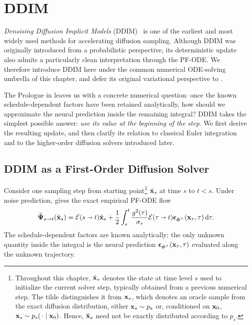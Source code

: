 \clearpage
\newpage

\section{\texorpdfstring{DDIM}{DDIM}}\label{sec:revisit-ddim}

\emph{Denoising Diffusion Implicit Models} (DDIM)~\citep{song2020denoising}
is one of the earliest and most widely used methods for accelerating diffusion
sampling. Although DDIM was originally introduced from a probabilistic
perspective, its deterministic update also admits a particularly clean
interpretation through the PF-ODE. We therefore introduce DDIM here under the
common numerical ODE-solving umbrella of this chapter, and defer its original
variational perspective to .

The Prologue in  leaves us with a concrete numerical question: once the known
schedule-dependent factors have been retained analytically, how should we
approximate the neural prediction inside the remaining integral? DDIM takes
the simplest possible answer: \emph{use its value at the beginning of the step}.
We first derive the resulting update, and then clarify its relation to
classical Euler integration and to the higher-order diffusion solvers
introduced later.


\subsection{DDIM as a First-Order Diffusion Solver}\label{subsec:ddim-different-para}

Consider one sampling step from starting point\footnote{Throughout this chapter, $\tilde{{\mathbf{x}}}_s$ denotes the state at time level $s$ used to initialize the current solver step, typically obtained from a previous numerical step. The tilde distinguishes it from ${\mathbf{x}}_s$, which denotes an oracle sample from the exact diffusion distribution, either ${\mathbf{x}}_s \sim p_s$ or, conditioned on ${\mathbf{x}}_0$, ${\mathbf{x}}_s \sim p_s(\,\cdot \mid {\mathbf{x}}_0)$. Hence, $\tilde{{\mathbf{x}}}_s$ need not be exactly distributed according to $p_s$.} $\tilde{{\mathbf{x}}}_s$ at time $s$ to $t<s$. Under noise prediction,
 gives the exact empirical PF-ODE flow
\begin{align*}
\widetilde{{\bm{\Psi}}}_{s\to t}(\tilde{{\mathbf{x}}}_s)
=
\mathcal E(s\shortrightarrow t)\tilde{{\mathbf{x}}}_s
+
\frac{1}{2}
\int_s^t
\frac{g^2(\tau)}{\sigma_\tau}
\mathcal E(\tau\shortrightarrow t)
{\bm{\epsilon}}_{\bm{\phi}^\times}({\mathbf{x}}_\tau,\tau)
\mathop{}\!\mathrm{d}\tau .
\end{align*}
The schedule-dependent factors are known analytically; the only unknown
quantity inside the integral is the neural prediction
${\bm{\epsilon}}_{\bm{\phi}^\times}({\mathbf{x}}_\tau,\tau)$ evaluated along the unknown
trajectory.

